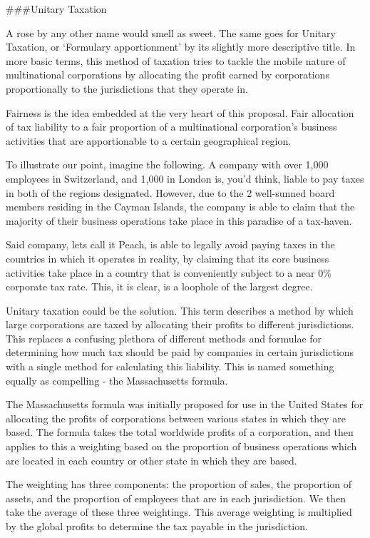 \documentclass[]{tufte-handout}
\begin{document}
\#\#\#Unitary Taxation

A rose by any other name would smell as sweet. The same goes for Unitary
Taxation, or `Formulary apportionment' by its slightly more descriptive
title. In more basic terms, this method of taxation tries to tackle the
mobile nature of multinational corporations by allocating the profit
earned by corporations proportionally to the jurisdictions that they
operate in.

Fairness is the idea embedded at the very heart of this proposal. Fair
allocation of tax liability to a fair proportion of a multinational
corporation's business activities that are apportionable to a certain
geographical region.

To illustrate our point, imagine the following. A company with over
1,000 employees in Switzerland, and 1,000 in London is, you'd think,
liable to pay taxes in both of the regions designated. However, due to
the 2 well-sunned board members residing in the Cayman Islands, the
company is able to claim that the majority of their business operations
take place in this paradise of a tax-haven.

Said company, lets call it Peach, is able to legally avoid paying taxes
in the countries in which it operates in reality, by claiming that its
core business activities take place in a country that is conveniently
subject to a near 0\% corporate tax rate. This, it is clear, is a
loophole of the largest degree.

Unitary taxation could be the solution. This term describes a method by
which large corporations are taxed by allocating their profits to
different jurisdictions. This replaces a confusing plethora of different
methods and formulae for determining how much tax should be paid by
companies in certain jurisdictions with a single method for calculating
this liability. This is named something equally as compelling - the
Massachusetts formula.

The Massachusetts formula was initially proposed for use in the United
States for allocating the profits of corporations between various states
in which they are based. The formula takes the total worldwide profits
of a corporation, and then applies to this a weighting based on the
proportion of business operations which are located in each country or
other state in which they are based.

The weighting has three components: the proportion of sales, the
proportion of assets, and the proportion of employees that are in each
jurisdiction. We then take the average of these three weightings. This
average weighting is multiplied by the global profits to determine the
tax payable in the jurisdiction.
\end{document}
